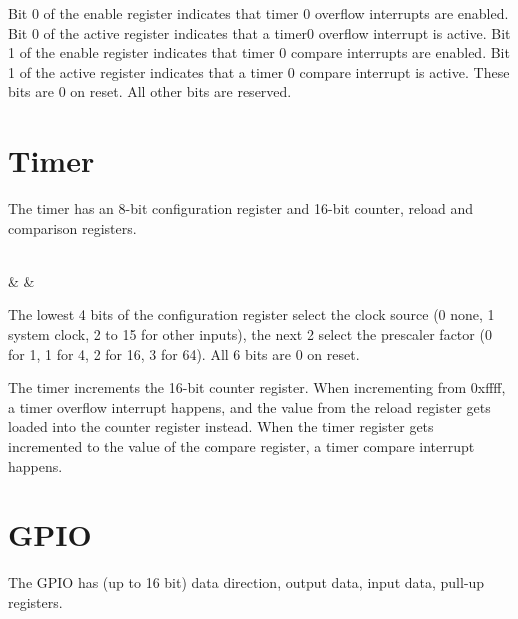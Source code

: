 \documentclass{book}
\begin{document}
Bit 0 of the enable register indicates that timer 0 overflow interrupts are enabled. Bit 0 of the active register indicates that a timer0 overflow interrupt is active. Bit 1 of the enable register indicates that timer 0 compare interrupts are enabled. Bit 1 of the active register indicates that a timer 0 compare interrupt is active. These bits are 0 on reset. All other bits are reserved.

\section{Timer}

The timer has an 8-bit configuration register and 16-bit counter, reload and comparison registers.

\vspace{3mm}
\begin{bytefield}[bitwidth=0.13\linewidth]{8}
	 \\
	 &  & 
\end{bytefield}

The lowest 4 bits of the configuration register select the clock source (0 none, 1 system clock, 2 to 15 for other inputs), the next 2 select the prescaler factor (0 for 1, 1 for 4, 2 for 16, 3 for 64). All 6 bits are 0 on reset.

The timer increments the 16-bit counter register. When incrementing from 0xffff, a timer overflow interrupt happens, and the value from the reload register gets loaded into the counter register instead. When the timer register gets incremented to the value of the compare register, a timer compare interrupt happens.

\section{GPIO}

The GPIO has (up to 16 bit) data direction, output data, input data, pull-up registers.
\end{document}
